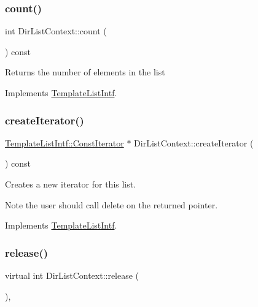\subsubsection{\texorpdfstring{count()}{count()}}
{\footnotesize\ttfamily int Dir\+List\+Context\+::count (\begin{DoxyParamCaption}{ }\end{DoxyParamCaption}) const\hspace{0.3cm}{\ttfamily [virtual]}}

Returns the number of elements in the list 

Implements \mbox{\hyperlink{class_template_list_intf_a329e49e33484c2aa5106aac1bf4e5216}{Template\+List\+Intf}}.

\mbox{\label{class_dir_list_context_a5232d5fdd257a935a949c5ed52681bcb}} 
\subsubsection{\texorpdfstring{createIterator()}{createIterator()}}
{\footnotesize\ttfamily \mbox{\hyperlink{class_template_list_intf_1_1_const_iterator}{Template\+List\+Intf\+::\+Const\+Iterator}} $\ast$ Dir\+List\+Context\+::create\+Iterator (\begin{DoxyParamCaption}{ }\end{DoxyParamCaption}) const\hspace{0.3cm}{\ttfamily [virtual]}}

Creates a new iterator for this list. \begin{DoxyNote}{Note}
the user should call delete on the returned pointer. 
\end{DoxyNote}


Implements \mbox{\hyperlink{class_template_list_intf_a56b82384db24c3e121076a1da046d378}{Template\+List\+Intf}}.

\mbox{\label{class_dir_list_context_a138217a1757cf808ffa7eeb9fb051855}} 
\subsubsection{\texorpdfstring{release()}{release()}}
{\footnotesize\ttfamily virtual int Dir\+List\+Context\+::release (\begin{DoxyParamCaption}{ }\end{DoxyParamCaption})\hspace{0.3cm}{\ttfamily [inline]}, {\ttfamily [virtual]}}

